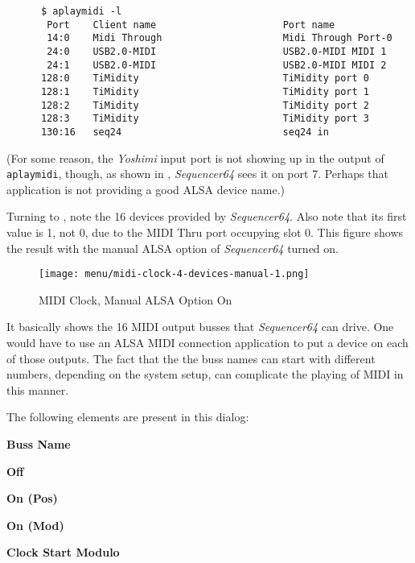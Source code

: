    \begin{verbatim}
      $ aplaymidi -l
       Port    Client name                      Port name
       14:0    Midi Through                     Midi Through Port-0
       24:0    USB2.0-MIDI                      USB2.0-MIDI MIDI 1
       24:1    USB2.0-MIDI                      USB2.0-MIDI MIDI 2
      128:0    TiMidity                         TiMidity port 0
      128:1    TiMidity                         TiMidity port 1
      128:2    TiMidity                         TiMidity port 2
      128:3    TiMidity                         TiMidity port 3
      130:16   seq24                            seq24 in
   \end{verbatim}

   (For some reason, the \textsl{Yoshimi} input port is not showing up
   in the output of \texttt{aplaymidi}, though, as shown in
   ,
   \textsl{Sequencer64} sees it on port 7.  Perhaps that application is not
   providing a good ALSA device name.)
   
   Turning to ,
   note the 16 devices provided by
   \textsl{Sequencer64}.  Also note that its first value is 1, not 0, due to
   the MIDI Thru port occupying slot 0.
   This figure shows the result with the manual ALSA option of
   \textsl{Sequencer64} turned on.

\begin{figure}[H]
   \centering 
   \texttt{[image: menu/midi-clock-4-devices-manual-1.png]}
   \caption{MIDI Clock, Manual ALSA Option On}
   \label{fig:seq64_midi_clock_4_devices_manual_1}
\end{figure}

   It basically shows the 16 MIDI output busses that \textsl{Sequencer64} can
   drive.  One would have to use an ALSA MIDI connection application to put a
   device on each of those outputs.  The fact that the the buss names can
   start with different numbers, depending on the system setup, can complicate
   the playing of MIDI in this manner.

   The following elements are present in this dialog:

   \begin{enumber}
      \item \textbf{Buss Name}
      \item \textbf{Off}
      \item \textbf{On (Pos)}
      \item \textbf{On (Mod)}
      \item \textbf{Clock Start Modulo}
   \end{enumber}

